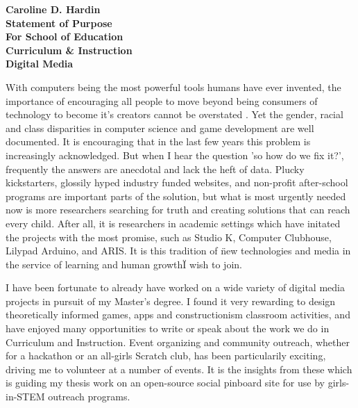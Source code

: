 \documentclass[12pt]{letter}
\newcommand{\ignore}[2]{\hspace{0in}#2} %
\begin{document}
\begin{letter}

\noindent 
\large\textbf{Caroline D. Hardin\\
Statement of Purpose\\
For School of Education\\
Curriculum \& Instruction\\
Digital Media
}
\vfill


\signature{Caroline D. Hardin} %


With computers being the most powerful tools humans have ever invented, the importance of encouraging all people to move beyond being consumers of technology to become it's creators cannot be overstated . Yet the gender, racial and class disparities in computer science and game development are well documented. It is encouraging that in the last few years this problem is increasingly acknowledged. But when I hear the question 'so how do we fix it?', frequently the answers are anecdotal and lack the heft of data. Plucky kickstarters, glossily hyped industry funded websites, and non-profit after-school programs are important parts of the solution, but what is most urgently needed now is more researchers searching for truth and creating solutions that can reach every child. After all, it is researchers in academic settings which have initated the projects with the most promise, such as Studio K, Computer Clubhouse, Lilypad Arduino, and ARIS. \ignore{is it bad I mention 3 MIT Projects to one UW Madison? Ok I changed scratch to StudioK} It is this tradition of \"new technologies and media in the service of learning and human growth\" I wish to join.

I have been fortunate to already have worked on a wide variety of digital media projects in pursuit of my Master's degree. I found it very rewarding to design theoretically informed games, apps and constructionism classroom activities, and have enjoyed many opportunities to write or speak about the work we do in Curriculum and Instruction. Event organizing and community outreach, whether for a hackathon or an all-girls Scratch club, has been particularily exciting, driving me to volunteer at a number of events. It is the insights from these which is guiding my thesis work on an open-source social pinboard site for use by girls-in-STEM outreach programs.


\end{letter}
\end{document}
